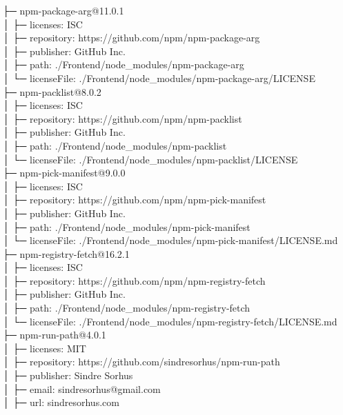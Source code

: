 \documentclass[
    paper=a4,
    twoside=false,
    parskip=half,
    listof=entryprefix,
    listof=totoc,
    index=totoc,
    bibliography=totoc,
    headsepline,
]{scrbook}
\begin{document}
    ├─ npm-package-arg@11.0.1\\
    │  ├─ licenses: ISC\\
    │  ├─ repository: https://github.com/npm/npm-package-arg\\
    │  ├─ publisher: GitHub Inc.\\
    │  ├─ path: ./Frontend/node\_modules/npm-package-arg\\
    │  └─ licenseFile: ./Frontend/node\_modules/npm-package-arg/LICENSE\\
    ├─ npm-packlist@8.0.2\\
    │  ├─ licenses: ISC\\
    │  ├─ repository: https://github.com/npm/npm-packlist\\
    │  ├─ publisher: GitHub Inc.\\
    │  ├─ path: ./Frontend/node\_modules/npm-packlist\\
    │  └─ licenseFile: ./Frontend/node\_modules/npm-packlist/LICENSE\\
    ├─ npm-pick-manifest@9.0.0\\
    │  ├─ licenses: ISC\\
    │  ├─ repository: https://github.com/npm/npm-pick-manifest\\
    │  ├─ publisher: GitHub Inc.\\
    │  ├─ path: ./Frontend/node\_modules/npm-pick-manifest\\
    │  └─ licenseFile: ./Frontend/node\_modules/npm-pick-manifest/LICENSE.md\\
    ├─ npm-registry-fetch@16.2.1\\
    │  ├─ licenses: ISC\\
    │  ├─ repository: https://github.com/npm/npm-registry-fetch\\
    │  ├─ publisher: GitHub Inc.\\
    │  ├─ path: ./Frontend/node\_modules/npm-registry-fetch\\
    │  └─ licenseFile: ./Frontend/node\_modules/npm-registry-fetch/LICENSE.md\\
    ├─ npm-run-path@4.0.1\\
    │  ├─ licenses: MIT\\
    │  ├─ repository: https://github.com/sindresorhus/npm-run-path\\
    │  ├─ publisher: Sindre Sorhus\\
    │  ├─ email: sindresorhus@gmail.com\\
    │  ├─ url: sindresorhus.com\\
\end{document}
